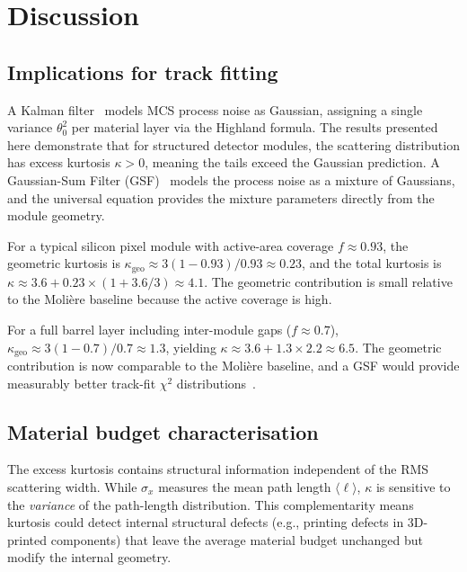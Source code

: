 \documentclass[final,5p,times,twocolumn]{elsarticle}
\begin{document}
\section{Discussion}
\label{sec:discussion}

\subsection{Implications for track fitting}
\label{sec:trackfitting}

A Kalman filter~\cite{Fruhwirth1987} models MCS process noise as Gaussian, assigning a single variance $\theta_0^2$ per material layer via the Highland formula.  The results presented here demonstrate that for structured detector modules, the scattering distribution has excess kurtosis $\kappa>0$, meaning the tails exceed the Gaussian prediction.  A Gaussian-Sum Filter (GSF)~\cite{FruhwirthRegler2001} models the process noise as a mixture of Gaussians, and the universal equation provides the mixture parameters directly from the module geometry.

For a typical silicon pixel module with active-area coverage $f\approx 0.93$, the geometric kurtosis is $\kappa_{\mathrm{geo}}\approx 3(1-0.93)/0.93 \approx 0.23$, and the total kurtosis is $\kappa\approx 3.6 + 0.23\times(1+3.6/3)\approx 4.1$.  The geometric contribution is small relative to the Moli\`{e}re baseline because the active coverage is high.

For a full barrel layer including inter-module gaps ($f\approx 0.7$), $\kappa_{\mathrm{geo}}\approx 3(1-0.7)/0.7\approx 1.3$, yielding $\kappa\approx 3.6 + 1.3\times 2.2\approx 6.5$.  The geometric contribution is now comparable to the Moli\`{e}re baseline, and a GSF would provide measurably better track-fit $\chi^2$ distributions~\cite{FruhwirthStrandlie2021}.

\subsection{Material budget characterisation}
\label{sec:matbudget}

The excess kurtosis contains structural information independent of the RMS scattering width.  While $\sigma_x$ measures the mean path length $\langle\ell\rangle$, $\kappa$ is sensitive to the \emph{variance} of the path-length distribution.  This complementarity means kurtosis could detect internal structural defects (e.g., printing defects in 3D-printed components) that leave the average material budget unchanged but modify the internal geometry.
\end{document}
